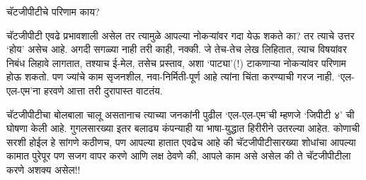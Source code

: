 चॅटजीपीटीचे परिणाम काय?

चॅटजीपीटी एवढे प्रभावशाली असेल तर त्यामुळे आपल्या नोकऱ्यांवर गदा येऊ शकते का? तर त्याचे उत्तर `होय' असेच आहे. अगदी सगळ्या नाही तरी काही, नक्की. जे तेच-तेच लेख लिहितात, त्याच विषयांवर निबंध लिहावे लागतात, तश्याच ई-मेल, तसेच प्रस्ताव, अशा `पाट्या'(!)  टाकणाऱ्या नोकऱ्यांवर परिणाम होऊ शकतो. पण ज्यांचे काम सृजनशील, नवा-निर्मिती-पूर्ण आहे त्यांना चिंता करण्याची गरज नाही. `एल-एल-एम'ना हरवणे आत्ता तरी दुरापास्त वाटतंय.

चॅटजीपीटीचा बोलबाला चालू असतानाच त्याच्या जनकांनी पुढील `एल-एल-एम'ची म्हणजे `जिपीटी ४' ची घोषणा केली आहे. गुगलसारख्या इतर बलाढ्य कंपन्याही या भाषा-युद्धात हिरीरीने उतरल्या आहेत. कोणाची सरशी होईल हे सांगणे कठीणच, पण आपल्या हातात एवढेच आहे की चॅटजीपीटीसारख्या शोधांचा आपल्या कामात पुरेपूर पण सजग वापर करणे आणि लक्ष ठेवणे की, आपले काम असे असेल की ते चॅटजीपीटीला करणे अशक्य असेल!!